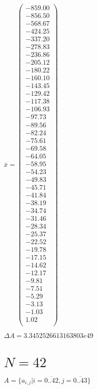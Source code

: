 \documentclass[a4paper,12pt]{article}
\begin{document}
$\bar { x } = \begin{pmatrix}
-859.00 \\
-856.50 \\
-568.67 \\
-424.25 \\
-337.20 \\
-278.83 \\
-236.86 \\
-205.12 \\
-180.22 \\
-160.10 \\
-143.45 \\
-129.42 \\
-117.38 \\
-106.93 \\
-97.73 \\
-89.56 \\
-82.24 \\
-75.61 \\
-69.58 \\
-64.05 \\
-58.95 \\
-54.23 \\
-49.83 \\
-45.71 \\
-41.84 \\
-38.19 \\
-34.74 \\
-31.46 \\
-28.34 \\
-25.37 \\
-22.52 \\
-19.78 \\
-17.15 \\
-14.62 \\
-12.17 \\
-9.81 \\
-7.51 \\
-5.29 \\
-3.13 \\
-1.03 \\
1.02 \\
\end{pmatrix}
$

$\Delta A = 3.3452526613163803e49$



\section{ $N = 42$ }
$A = \{ a _{ i, j } | i = \overline { 0..42 }, j = \overline { 0..43 } \}$
\end{document}
